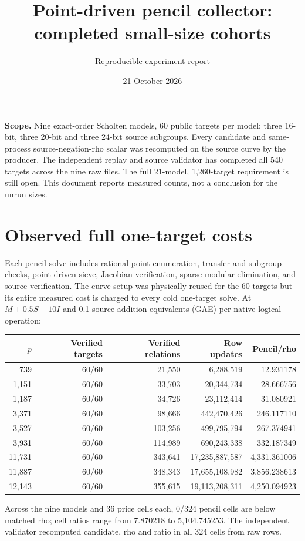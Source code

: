 \documentclass[10pt]{article}
\title{Point-driven pencil collector: completed small-size cohorts}
\author{Reproducible experiment report}
\date{21 October 2026}
\begin{document}
\maketitle
\noindent\textbf{Scope.} Nine exact-order Scholten models, 60 public targets
per model: three 16-bit, three 20-bit and three 24-bit source subgroups. Every
candidate and same-process source-negation-rho scalar was recomputed on the
source curve by the producer. The independent replay and source validator has
completed all 540 targets across the nine raw files.
The full 21-model, 1,260-target requirement is still open. This document
reports measured counts, not a conclusion for the unrun sizes.

\section*{Observed full one-target costs}
Each pencil solve includes rational-point enumeration, transfer and subgroup
checks, point-driven sieve, Jacobian verification, sparse modular elimination,
and source verification. The curve setup was physically reused for the 60
targets but its entire measured cost is charged to every cold one-target
solve. At $M+0.5S+10I$ and 0.1 source-addition equivalents (GAE) per native
logical operation:
\begin{center}\small
\begin{tabular}{rrrrr}
\toprule
$p$ & Verified targets & Verified relations & Row updates & Pencil/rho \\
\midrule
739 & 60/60 & 21,550 & 6,288,519 & 12.931178 \\
1,151 & 60/60 & 33,703 & 20,344,734 & 28.666756 \\
1,187 & 60/60 & 34,726 & 23,112,414 & 31.080921 \\
3,371 & 60/60 & 98,666 & 442,470,426 & 246.117110 \\
3,527 & 60/60 & 103,256 & 499,795,794 & 267.374941 \\
3,931 & 60/60 & 114,989 & 690,243,338 & 332.187349 \\
11,731 & 60/60 & 343,641 & 17,235,887,587 & 4,331.361006 \\
11,887 & 60/60 & 348,343 & 17,655,108,982 & 3,856.238613 \\
12,143 & 60/60 & 355,615 & 19,113,208,311 & 4,250.094923 \\
\bottomrule
\end{tabular}
\end{center}
Across the nine models and 36 price cells each, 0/324 pencil cells are below
matched rho; cell ratios range from 7.870218 to 5,104.745253. The independent
validator recomputed candidate, rho and ratio in all 324 cells from raw rows.
\end{document}
